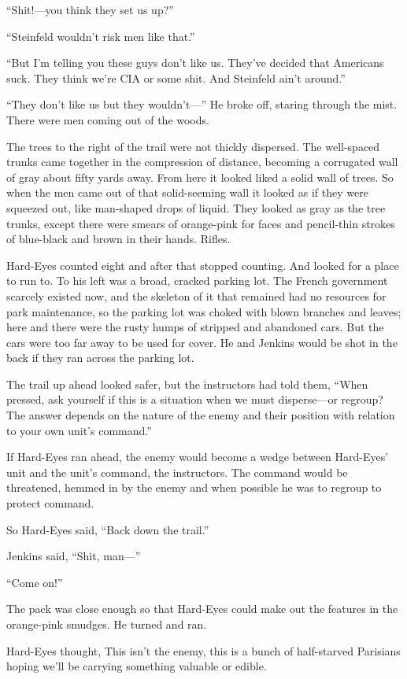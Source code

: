 “Shit!—you think they set us up?”

“Steinfeld wouldn’t risk men like that.”

“But I’m telling you these guys don’t like us. They’ve decided that Americans suck. They think we’re CIA or some shit. And Steinfeld ain’t around.”

“They don’t like us but they wouldn’t—” He broke off, staring through the mist. There were men coming out of the woods.

The trees to the right of the trail were not thickly dispersed. The well-spaced trunks came together in the compression of distance, becoming a corrugated wall of gray about fifty yards away. From here it looked liked a solid wall of trees. So when the men came out of that solid-seeming wall it looked as if they were squeezed out, like man-shaped drops of liquid. They looked as gray as the tree trunks, except there were smears of orange-pink for faces and pencil-thin strokes of blue-black and brown in their hands. Rifles.

Hard-Eyes counted eight and after that stopped counting. And looked for a place to run to. To his left was a broad, cracked parking lot. The French government scarcely existed now, and the skeleton of it that remained had no resources for park maintenance, so the parking lot was choked with blown branches and leaves; here and there were the rusty humps of stripped and abandoned cars. But the cars were too far away to be used for cover. He and Jenkins would be shot in the back if they ran across the parking lot.

The trail up ahead looked safer, but the instructors had told them, “When pressed, ask yourself if this is a situation when we must disperse—or regroup? The answer depends on the nature of the enemy and their position with relation to your own unit’s command.”

If Hard-Eyes ran ahead, the enemy would become a wedge between Hard-Eyes’ unit and the unit’s command, the instructors. The command would be threatened, hemmed in by the enemy and when possible he was to regroup to protect command.

So Hard-Eyes said, “Back down the trail.”

Jenkins said, “Shit, man—”

“Come on!”

The pack was close enough so that Hard-Eyes could make out the features in the orange-pink smudges. He turned and ran.

Hard-Eyes thought, This isn’t the enemy, this is a bunch of half-starved Parisians hoping we’ll be carrying something valuable or edible.

